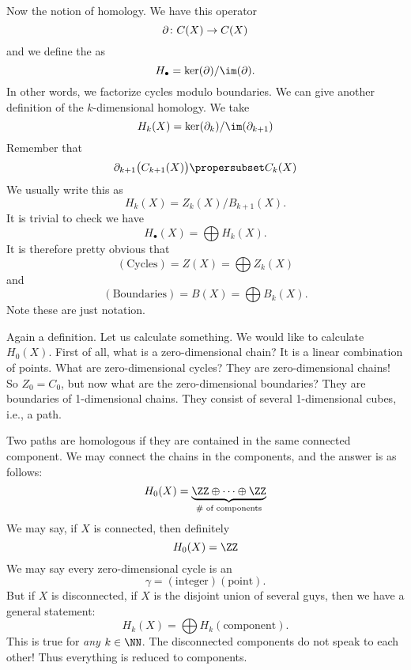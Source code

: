 Now the notion of homology. We have this operator
\begin{equation}
\partial\colon C(X)\to C(X)
\end{equation}
and we define the  as
\begin{equation}
H_{\bullet}=\ker(\bdry)/\im(\bdry).
\end{equation}
In other words, we factorize cycles modulo boundaries. We can
give another definition of the $k$-dimensional homology.
We take
\begin{equation}
H_{k}(X)=\ker(\bdry_k)/\im(\bdry_{k+1})
\end{equation}
Remember that
\begin{equation}
\bdry_{k+1}\bigl(C_{k+1}(X)\bigr)\propersubset C_{k}(X)
\end{equation}
We usually write this as
\begin{equation}
H_{k}(X)=Z_{k}(X)/B_{k+1}(X).
\end{equation}
It is trivial to check we have
\begin{equation}
H_{\bullet}(X)=\bigoplus H_{k}(X).
\end{equation}
It is therefore pretty obvious that
\begin{equation}
(\mbox{Cycles}) = Z(X)=\bigoplus Z_{k}(X)
\end{equation}
and
\begin{equation}
(\mbox{Boundaries}) = B(X) = \bigoplus B_{k}(X).
\end{equation}
Note these are just notation.

Again a definition. Let us calculate something. We would like to
calculate $H_{0}(X)$. First of all, what is a zero-dimensional
chain? It is a linear combination of points. What are
zero-dimensional cycles? They are zero-dimensional chains! So
$Z_{0}=C_{0}$, but now what are the zero-dimensional boundaries?
They are boundaries of 1-dimensional chains. They consist of
several 1-dimensional cubes, i.e., a path.

Two paths are homologous if they are contained in the same
connected component. We may connect the chains in the components,
and the answer is as follows:
\begin{equation}
H_{0}(X)=\underbrace{\ZZ\oplus\dots\oplus\ZZ}_{\text{\# of components}}
\end{equation}
We may say, if $X$ is connected, then definitely
\begin{equation}
H_{0}(X)=\ZZ
\end{equation}
We may say every zero-dimensional cycle is an 
\begin{equation*}
\gamma = (\mbox{integer})(\mbox{point}).
\end{equation*}
But if $X$ is disconnected, if $X$ is the disjoint union of
several guys, then we have a general statement:
\begin{equation}
H_{k}(X) = \bigoplus H_{k}(\mbox{component}).
\end{equation}
This is true for \emph{any} $k\in\NN$. The disconnected
components do not speak to each other! Thus everything is reduced
to components.
